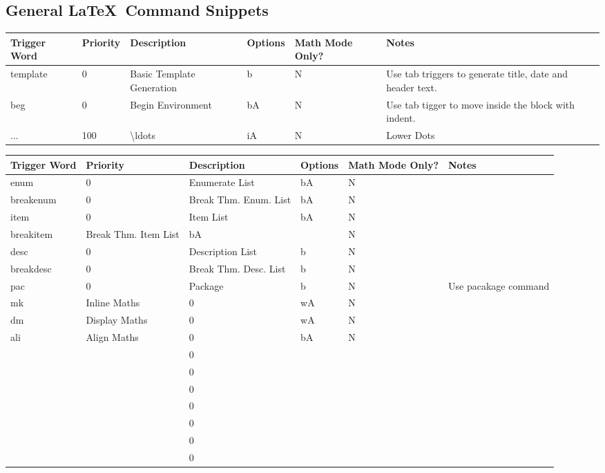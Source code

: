 \documentclass[11pt]{article}
\theoremstyle{plain}%
\theoremstyle{definition}
\theoremstyle{remark}
\theoremstyle{breakthm}
\theoremstyle{breakdefn}
\theoremstyle{breakrem}
\begin{document}
	\subsection{General \LaTeX\ Command Snippets}
	\begin{center}
	\begin{table}[htbp]
		\begin{tabular}{||m{2cm}|m{1.5cm}|m{3cm}|m{1.5cm}|m{2.5cm}|m{4cm}||}
		\hline
		\textbf{Trigger Word} & \textbf{Priority} & \textbf{Description} & \textbf{Options} & \textbf{Math Mode Only?} & \textbf{Notes} \\
		\hline
		\hline
		template & 0 &Basic Template Generation & b & N & Use tab triggers to generate title, date and header text. \\ \hline
		beg & 0 & Begin Environment & bA & N & Use tab tigger to move inside the block with indent. \\ \hline
		... & 100 & \textbackslash ldots & iA & N & Lower Dots \\ \hline 
		\end{tabular}
	\end{table}
	\newpage
	\begin{table}[htbp]
		\begin{tabular}{||m{2cm}|m{1.5cm}|m{3cm}|m{1.5cm}|m{2.5cm}|m{4cm}||}
		\hline
		\textbf{Trigger Word} & \textbf{Priority} & \textbf{Description} & \textbf{Options} & \textbf{Math Mode Only?} & \textbf{Notes} \\
		\hline
		\hline
		enum & 0 & Enumerate List & bA & N &  \\ \hline
		breakenum & 0 & Break Thm. Enum. List & bA & N &  \\ \hline
		item & 0 & Item List & bA & N &  \\ \hline
		breakitem & Break Thm. Item List & bA &  & N &  \\ \hline
		desc & 0 & Description List & b & N &  \\ \hline
		breakdesc & 0 & Break Thm. Desc. List & b & N &  \\ \hline
		pac & 0 & Package & b & N & Use pacakage command \\ \hline
		mk & Inline Maths & 0 & wA & N &  \\ \hline
		dm & Display Maths & 0 & wA & N &  \\ \hline
		ali & Align Maths & 0 & bA & N &  \\ \hline
		 &  & 0 &  &  &  \\ \hline
		 &  & 0 &  &  &  \\ \hline
		 &  & 0 &  &  &  \\ \hline
		 &  & 0 &  &  &  \\ \hline
		 &  & 0 &  &  &  \\ \hline
		 &  & 0 &  &  &  \\ \hline
		 &  & 0 &  &  &  \\ \hline
		\end{tabular}
	\end{table}
	\end{center}
\end{document}
